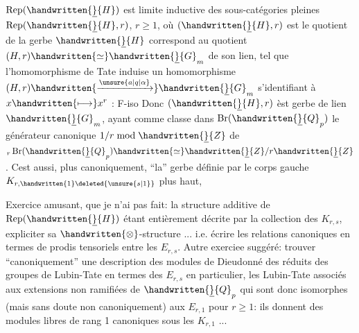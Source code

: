 $\operatorname{Rep}(\handwritten{\underline}{H})$ est limite inductive des sous-catégories pleines $\operatorname{Rep}(\handwritten{\underline}{H},r)$, $r\geq1$, où $(\handwritten{\underline}{H},r)$ est le quotient de la gerbe $\handwritten{\underline}{H}$ correspond au quotient $(H,r)\handwritten{\simeq}\handwritten{\underline}{G}_m$ de son lien, tel que l'homomorphisme de Tate  induise un homomorphisme $(H,r)\handwritten{\xrightarrow{\unsure{a|q|\alpha}}}\handwritten{\underline}{G}_m$ s'identifiant à $x\handwritten{\longmapsto}x^r$ : F-iso Donc $(\handwritten{\underline}{H},r)$  èst  gerbe de lien $\handwritten{\underline}{G}_m$, ayant comme classe dans $\operatorname{Br}(\handwritten{\underline}{Q}_p)$ le générateur canonique $1/r\bmod\handwritten{\underline}{Z}$ de ${}_r\operatorname{Br}(\handwritten{\underline}{Q}_p)\handwritten{\simeq}\handwritten{\underline}{Z}/r\handwritten{\underline}{Z}$. Cest aussi, plus canoniquement, ``la'' gerbe définie par le corps gauche $K_{r,\handwritten{1}\deleted{\unsure{s|1}}}$ plus haut, 

\handwritten{[}Exercice amusant, que je n'ai pas fait: la structure additive de $\operatorname{Rep}(\handwritten{\underline}{H})$ étant entièrement décrite par la collection des $K_{r,s}$, expliciter sa $\handwritten{\otimes}$-structure ... i.e. écrire les relations canoniques en termes de prodis tensoriels entre les $E_{r,s}$. Autre exerciee suggéré: trouver ``canoniquement'' une description des modules de Dieudonné des réduits des groupes de Lubin-Tate en termes des $E_{r,s}$  \handwritten{(}en particulier, les Lubin-Tate associés aux extensions non ramifiées
de $\handwritten{\underline}{Q}_p$ \handwritten{)} qui sont donc isomorphes  (mais sans doute non canoniquement) aux $E_{r,1}$ pour $r\geq1$: ils donnent des modules libres de rang 1 canoniques sous les $K_{r,1}$ ...\handwritten{]}


